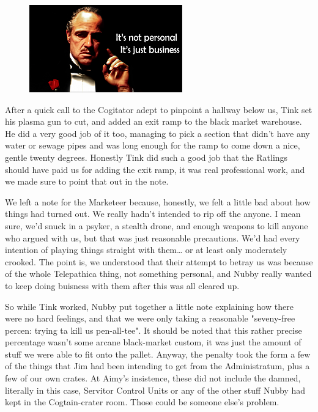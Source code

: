 \begin{figure}
	\begin{center}
		\includegraphics[width=\figwidth]{pics/14/29.png}
	\end{center}
\end{figure}
After a quick call to the Cogitator adept to pinpoint a hallway below us, Tink set his plasma gun to cut, and added an exit ramp to the black market warehouse. 
He did a very good job of it too, managing to pick a section that didn't have any water or sewage pipes and was long enough for the ramp to come down a nice, gentle twenty degrees. 
Honestly Tink did such a good job that the Ratlings should have paid us for adding the exit ramp, it was real professional work, and we made sure to point that out in the note.

We left a note for the Marketeer because, honestly, we felt a little bad about how things had turned out. 
We really hadn't intended to rip off the anyone. 
I mean sure, we'd snuck in a psyker, a stealth drone, and enough weapons to kill anyone who argued with us, but that was just reasonable precautions. 
We'd had every intention of playing things straight with them… or at least only moderately crooked. 
The point is, we understood that their attempt to betray us was because of the whole Telepathica thing, not something personal, and Nubby really wanted to keep doing buisness with them after this was all cleared up.

So while Tink worked, Nubby put together a little note explaining how there were no hard feelings, and that we were only taking a reasonable "seveny-free percen: 
trying ta kill us pen-all-tee". 
It should be noted that this rather precise percentage wasn't some arcane black-market custom, it was just the amount of stuff we were able to fit onto the pallet. 
Anyway, the penalty took the form a few of the things that Jim had been intending to get from the Administratum, plus a few of our own crates. 
At Aimy's insistence, these did not include the damned, literally in this case, Servitor Control Units or any of the other stuff Nubby had kept in the Cogtain-crater room. 
Those could be someone else's problem.


